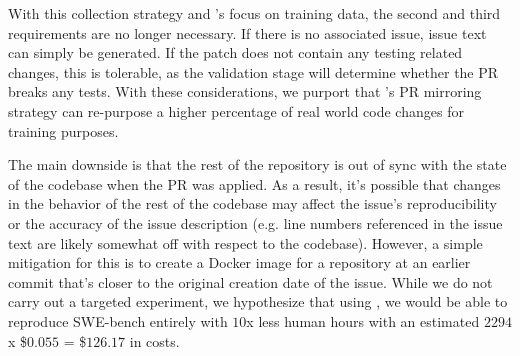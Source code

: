 With this collection strategy and \bugs{}'s focus on training data, the second and third requirements are no longer necessary.
If there is no associated issue, issue text can simply be generated.
If the patch does not contain any testing related changes, this is tolerable, as the validation stage will determine whether the PR breaks any tests.
With these considerations, we purport that \bugs{}'s PR mirroring strategy can re-purpose a higher percentage of real world code changes for training purposes.

The main downside is that the rest of the repository is out of sync with the state of the codebase when the PR was applied.
As a result, it's possible that changes in the behavior of the rest of the codebase may affect the issue's reproducibility or the accuracy of the issue description (e.g. line numbers referenced in the issue text are likely somewhat off with respect to the codebase).
However, a simple mitigation for this is to create a Docker image for a repository at an earlier commit that's closer to the original creation date of the issue.
While we do not carry out a targeted experiment, we hypothesize that using \bugs{}, we would be able to reproduce SWE-bench entirely with $10$x less human hours with an estimated $2294$ x \$$0.055$ = \$$126.17$ in costs.